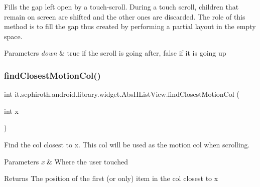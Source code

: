 Fills the gap left open by a touch-\/scroll. During a touch scroll, children that remain on screen are shifted and the other ones are discarded. The role of this method is to fill the gap thus created by performing a partial layout in the empty space.


\begin{DoxyParams}{Parameters}
{\em down} & true if the scroll is going after, false if it is going up \\
\hline
\end{DoxyParams}
\mbox{\label{classit_1_1sephiroth_1_1android_1_1library_1_1widget_1_1_abs_h_list_view_ac75be4f1686aaac4a34ee0bee6893728}} 
\subsubsection{\texorpdfstring{find\+Closest\+Motion\+Col()}{findClosestMotionCol()}}
{\footnotesize\ttfamily int it.\+sephiroth.\+android.\+library.\+widget.\+Abs\+H\+List\+View.\+find\+Closest\+Motion\+Col (\begin{DoxyParamCaption}\item[{int}]{x }\end{DoxyParamCaption})\hspace{0.3cm}{\ttfamily [protected]}}

Find the col closest to x. This col will be used as the motion col when scrolling.


\begin{DoxyParams}{Parameters}
{\em x} & Where the user touched \\
\hline
\end{DoxyParams}
\begin{DoxyReturn}{Returns}
The position of the first (or only) item in the col closest to x 
\end{DoxyReturn}
\mbox{\label{classit_1_1sephiroth_1_1android_1_1library_1_1widget_1_1_abs_h_list_view_a71c1ed69a6ae3797122ef6270da8c8e5}} 
